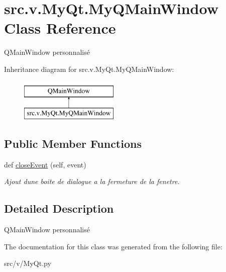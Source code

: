 \hypertarget{classsrc_1_1v_1_1_my_qt_1_1_my_q_main_window}{}\section{src.\+v.\+My\+Qt.\+My\+Q\+Main\+Window Class Reference}
\label{classsrc_1_1v_1_1_my_qt_1_1_my_q_main_window}


Q\+Main\+Window personnalisé  


Inheritance diagram for src.\+v.\+My\+Qt.\+My\+Q\+Main\+Window\+:\begin{figure}[H]
\begin{center}
\leavevmode
\includegraphics[height=2.000000cm]{classsrc_1_1v_1_1_my_qt_1_1_my_q_main_window}
\end{center}
\end{figure}
\subsection*{Public Member Functions}
\begin{DoxyCompactItemize}
\item 
\hypertarget{classsrc_1_1v_1_1_my_qt_1_1_my_q_main_window_a8f0b6c7bbb43e4f5c3088dd483e1ff2f}{}def \hyperlink{classsrc_1_1v_1_1_my_qt_1_1_my_q_main_window_a8f0b6c7bbb43e4f5c3088dd483e1ff2f}{close\+Event} (self, event)\label{classsrc_1_1v_1_1_my_qt_1_1_my_q_main_window_a8f0b6c7bbb43e4f5c3088dd483e1ff2f}

\begin{DoxyCompactList}\small\item\em Ajout d\textquotesingle{}une boite de dialogue a la fermeture de la fenetre. \end{DoxyCompactList}\end{DoxyCompactItemize}


\subsection{Detailed Description}
Q\+Main\+Window personnalisé 

The documentation for this class was generated from the following file\+:\begin{DoxyCompactItemize}
\item 
src/v/My\+Qt.\+py\end{DoxyCompactItemize}
